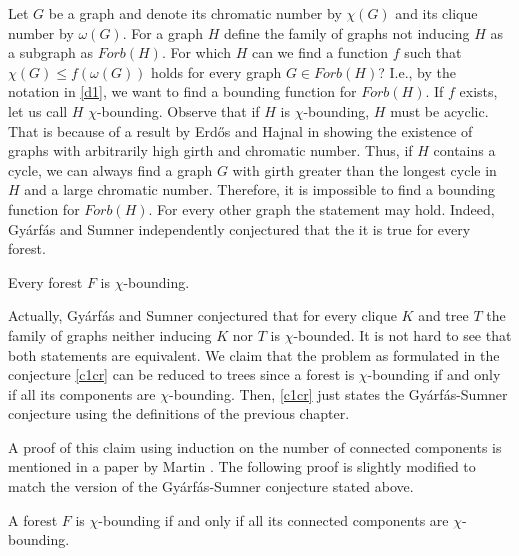 Let $G$ be a graph and denote its chromatic number by $\chi (G)$ and its clique number by $\omega (G)$. For a graph $H$ define the family of graphs not inducing $H$ as a subgraph as $\textit{Forb}(H)$. For which $H$ can we find a function $f$ such that $\chi (G)\leq f(\omega (G))$ holds for every graph $G\in\textit{Forb}(H)$? I.e., by the notation in \ref{d1}, we want to find a bounding function for $\textit{Forb}(H)$. If $f$ exists, let us call $H$ $\chi $-bounding. Observe that if $H$ is $\chi $-bounding, $H$ must be acyclic. That is because of a result by Erd\H{o}s and Hajnal in \cite{EH66} showing the existence of graphs with arbitrarily high girth and chromatic number. Thus, if $H$ contains a cycle, we can always find a graph $G$ with girth greater than the longest cycle in $H$ and a large chromatic number. Therefore, it is impossible to find a bounding function for $\textit{Forb}(H)$. For every other graph the statement may hold. Indeed, Gyárfás \cite{Gy75} and Sumner \cite{Su81} independently conjectured that the it is true for every forest.

\begin{con}\label{c1cr}
Every forest $F$ is $\chi$-bounding.
\end{con}

Actually, Gyárfás and Sumner conjectured that for every clique $K$ and tree $T$ the family of graphs neither inducing $K$ nor $T$ is $\chi$-bounded. It is not hard to see that both statements are equivalent. We claim that the problem as formulated in the conjecture \ref{c1cr} can be reduced to trees since a forest is $\chi$-bounding if and only if all its components are $\chi$-bounding. Then, \ref{c1cr} just states the Gyárfás-Sumner conjecture using the definitions of the previous chapter. 

A proof of this claim using induction on the number of connected components is mentioned in a paper by Martin \cite{Ma16}. The following proof is slightly modified to match the version of the Gyárfás-Sumner conjecture stated above.

\begin{thm}
A forest $F$ is $\chi$-bounding if and only if all its connected components are $\chi$-bounding.
\end{thm}

